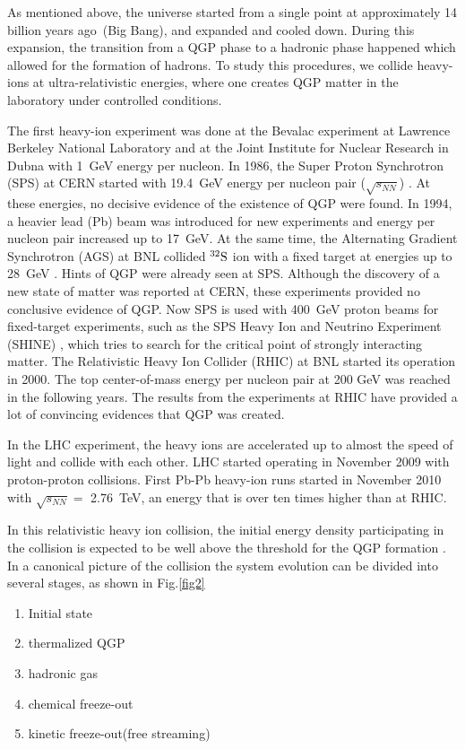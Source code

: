 As mentioned above, the universe started from a single point at approximately 14 billion years ago~(Big Bang), and expanded and cooled down. During this expansion, the transition from a QGP phase to a hadronic phase happened which allowed for the formation of hadrons.  To study this procedures, we collide heavy-ions at ultra-relativistic energies, where one creates QGP matter in the laboratory under controlled conditions. 

The first heavy-ion experiment was done at the Bevalac experiment at Lawrence Berkeley National Laboratory \cite{lofgren2008accelerator} and at the Joint Institute for Nuclear Research in Dubna \cite{kovalenko1994status} with 1~GeV energy per nucleon. In 1986, the Super Proton Synchrotron (SPS) at CERN started with 19.4~GeV energy per nucleon pair ($\sqrt{s_{NN}}$) \cite{gyulassy2005new}. At these energies, no decisive evidence of the existence of QGP were found. In 1994, a heavier lead (Pb) beam was introduced for new experiments and energy per nucleon pair increased up to 17~GeV. At the same time,  the Alternating Gradient Synchrotron (AGS) at BNL collided $^{32} \rm{S}$ ion with a fixed target at energies up to 28~GeV \cite{barton1987heavy}. Hints of QGP were already seen at SPS. Although the discovery of a new state of matter was reported at CERN, these experiments provided no conclusive evidence of QGP.  Now SPS is used with 400~GeV proton beams for fixed-target experiments, such as the SPS Heavy Ion and Neutrino Experiment (SHINE) \cite{grebieszkow2014hot}, which tries to search for the critical point of strongly interacting matter. The Relativistic Heavy Ion Collider (RHIC) at BNL started its operation in 2000. The top center-of-mass energy per nucleon pair at 200 GeV was reached in the following years. The results from the experiments at RHIC have provided a lot of convincing evidences that QGP was created. \cite{arsene2005quark, Back:2004je}

In the LHC experiment, the heavy ions are accelerated up to almost the speed of light and collide with each other. LHC started operating in November 2009 with proton-proton collisions. First Pb-Pb heavy-ion runs started in November 2010 with $\sqrt{s_{NN}}=$ 2.76~TeV, an energy that is over ten times higher than at RHIC.

 In this relativistic heavy ion collision, the initial energy density participating in the collision is expected to be well above the threshold for the QGP formation \cite{PhysRevD.27.140}.  In a canonical picture of the collision \cite{Kolb:2003dz} the system evolution can be divided into several stages, as shown in Fig.\ref{fig2}
  \begin{enumerate}
 	\item Initial state
 	\item thermalized QGP
 	\item hadronic gas
 	\item chemical freeze-out
 	\item kinetic freeze-out(free streaming)
 \end{enumerate}
 
